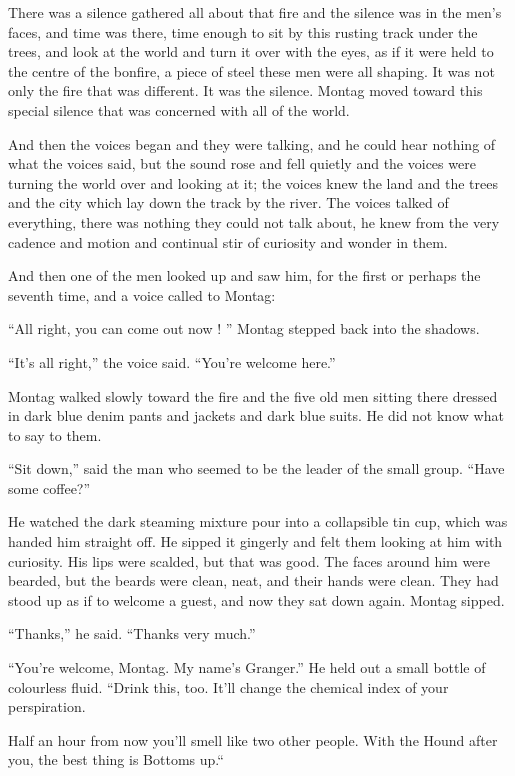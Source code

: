 \documentclass[11pt,openany]{book}
\begin{document}
There was a silence gathered all about that fire and the silence was in the men's faces, and time was there, time enough to sit by this rusting track under the trees, and look at the world and turn it over with the eyes, as if it were held to the centre of the bonfire, a piece of steel these men were all shaping. It was not only the fire that was different. It was the silence. Montag moved toward this special silence that was concerned with all of the world.

And then the voices began and they were talking, and he could hear nothing of what the voices said, but the sound rose and fell quietly and the voices were turning the world over and looking at it; the voices knew the land and the trees and the city which lay down the track by the river. The voices talked of everything, there was nothing they could not talk about, he knew from the very cadence and motion and continual stir of curiosity and wonder in them.

And then one of the men looked up and saw him, for the first or perhaps the seventh time, and a voice called to Montag:

``All right, you can come out now ! '' Montag stepped back into the shadows.

``It's all right,'' the voice said. ``You're welcome here.''

Montag walked slowly toward the fire and the five old men sitting there dressed in dark blue denim pants and jackets and dark blue suits. He did not know what to say to them.

``Sit down,'' said the man who seemed to be the leader of the small group. ``Have some coffee?''

He watched the dark steaming mixture pour into a collapsible tin cup, which was handed him straight off. He sipped it gingerly and felt them looking at him with curiosity. His lips were scalded, but that was good. The faces around him were bearded, but the beards were clean, neat, and their hands were clean. They had stood up as if to welcome a guest, and now they sat down again. Montag sipped.

``Thanks,'' he said. ``Thanks very much.''

``You're welcome, Montag. My name's Granger.'' He held out a small bottle of colourless fluid. ``Drink this, too. It'll change the chemical index of your perspiration.

Half an hour from now you'll smell like two other people. With the Hound after you, the best thing is Bottoms up.``
\end{document}
